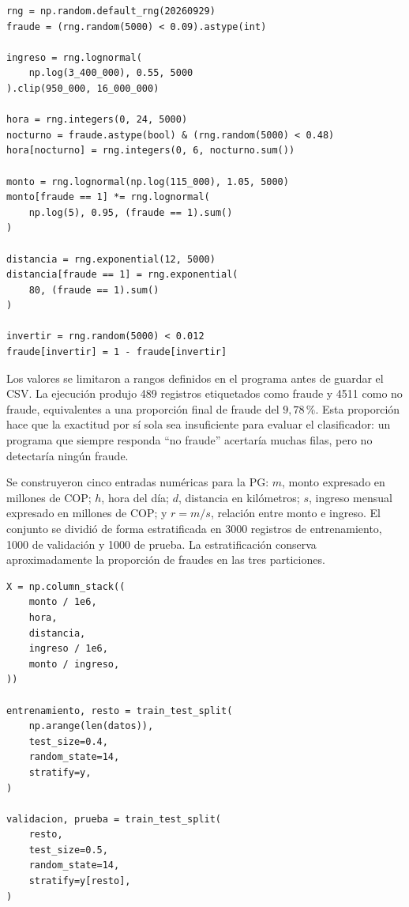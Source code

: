 \documentclass[14pt,twoside]{article}
\begin{document}
\begin{lstlisting}[style=pgpython,caption={Generación de transacciones sintéticas.}]
rng = np.random.default_rng(20260929)
fraude = (rng.random(5000) < 0.09).astype(int)

ingreso = rng.lognormal(
    np.log(3_400_000), 0.55, 5000
).clip(950_000, 16_000_000)

hora = rng.integers(0, 24, 5000)
nocturno = fraude.astype(bool) & (rng.random(5000) < 0.48)
hora[nocturno] = rng.integers(0, 6, nocturno.sum())

monto = rng.lognormal(np.log(115_000), 1.05, 5000)
monto[fraude == 1] *= rng.lognormal(
    np.log(5), 0.95, (fraude == 1).sum()
)

distancia = rng.exponential(12, 5000)
distancia[fraude == 1] = rng.exponential(
    80, (fraude == 1).sum()
)

invertir = rng.random(5000) < 0.012
fraude[invertir] = 1 - fraude[invertir]
\end{lstlisting}

Los valores se limitaron a rangos definidos en el programa antes de guardar el CSV. La ejecución produjo 489 registros etiquetados como fraude y 4511 como no fraude, equivalentes a una proporción final de fraude del \(9{,}78\,\%\). Esta proporción hace que la exactitud por sí sola sea insuficiente para evaluar el clasificador: un programa que siempre responda ``no fraude'' acertaría muchas filas, pero no detectaría ningún fraude.

Se construyeron cinco entradas numéricas para la PG: \(m\), monto expresado en millones de COP; \(h\), hora del día; \(d\), distancia en kilómetros; \(s\), ingreso mensual expresado en millones de COP; y \(r=m/s\), relación entre monto e ingreso. El conjunto se dividió de forma estratificada en 3000 registros de entrenamiento, 1000 de validación y 1000 de prueba. La estratificación conserva aproximadamente la proporción de fraudes en las tres particiones.

\begin{lstlisting}[style=pgpython,caption={Construcción de atributos y particiones estratificadas.}]
X = np.column_stack((
    monto / 1e6,
    hora,
    distancia,
    ingreso / 1e6,
    monto / ingreso,
))

entrenamiento, resto = train_test_split(
    np.arange(len(datos)),
    test_size=0.4,
    random_state=14,
    stratify=y,
)

validacion, prueba = train_test_split(
    resto,
    test_size=0.5,
    random_state=14,
    stratify=y[resto],
)
\end{lstlisting}
\end{document}
